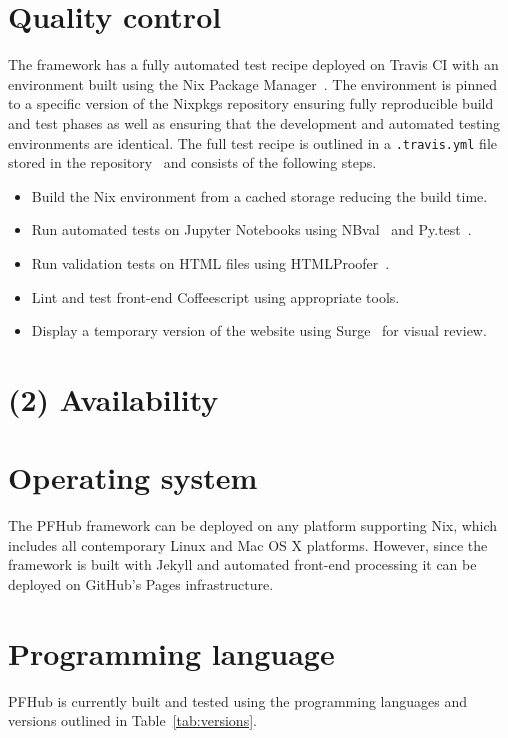 \documentclass{jors}
\begin{document}
\section*{Quality control}

The framework has a fully automated test recipe deployed on Travis CI
with an environment built using the Nix Package
Manager~\cite{nix}. The environment is pinned to a specific version of
the Nixpkgs repository ensuring fully reproducible build and test
phases as well as ensuring that the development and automated testing
environments are identical. The full test recipe is outlined in a
\texttt{.travis.yml} file stored in the repository~\cite{travisyml}
and consists of the following steps.

\begin{itemize}
  \item Build the Nix environment from a cached storage reducing the
    build time.
  \item Run automated tests on Jupyter Notebooks using
    NBval~\cite{nbval} and Py.test~\cite{pytest}.
  \item Run validation tests on HTML files using
    HTMLProofer~\cite{htmlproofer}.
  \item Lint and test front-end Coffeescript using appropriate tools.
  \item Display a temporary version of the website using
    Surge~\cite{surge} for visual review.
\end{itemize}

\section*{(2) Availability}
\vspace{0.5cm}
\section*{Operating system}

The PFHub framework can be deployed on any platform supporting Nix,
which includes all contemporary Linux and Mac OS X platforms. However,
since the framework is built with Jekyll and automated front-end
processing it can be deployed on GitHub's Pages infrastructure.


\section*{Programming language}

PFHub is currently built and tested using the programming languages
and versions outlined in Table~\ref{tab:versions}.
\end{document}
